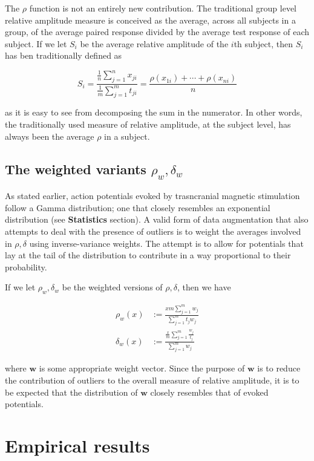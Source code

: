 \documentclass{article}
\begin{document}
\begin{multicols}{2}
The $\rho$ function is not an entirely new contribution. The
traditional group level relative amplitude measure is
conceived as the average, across all subjects in a group, of
the average paired response divided by the average test
response of each subject. If we let $S_i$ be the average
relative amplitude of the $i$th subject, then $S_i$ has ben
traditionally defined as

\begin{equation} S_i=\frac{\frac{1}{n}\sum_{j=1}^n
x_{ji}}{\frac{1}{m}\sum_{j=1}^m t_{ji}} =
\frac{\rho(x_{1i})+\cdots + \rho(x_{ni})}{n} \end{equation}

as it is easy to see from decomposing the sum in the
numerator. In other words, the traditionally used measure of
relative amplitude, at the subject level, has always been
the average $\rho$ in a subject. 

\subsection{The weighted variants $\rho_w, \delta_w$}

As stated earlier, action potentials evoked by trasncranial
magnetic stimulation follow a Gamma distribution; one that
closely resembles an exponential distribution (see
\textbf{Statistics} section). A valid form of data
augmentation that also attempts to deal with the presence of
outliers is to weight the averages involved in $\rho,
\delta$ using inverse-variance weights. The attempt is to
allow for potentials that lay at the tail of the
distribution to contribute in a way proportional to their
probability. 

If we let $\rho_w, \delta_w$ be the weighted versions of
$\rho, \delta$, then we have 

        \begin{align} \rho_w(x) &:= \frac{xm\sum_{j=1}^m
        w_j}{\sum_{j=1}^m t_j w_j} \\ \delta_w(x) &:=
    \frac{\frac{x}{m}\sum_{j=1}^m\frac{w_j}{t_j}}{\sum_{j=1}^m
w_j} \end{align}

where $\textbf{w}$ is some appropriate weight vector. Since
the purpose of $\textbf{w}$ is to reduce the contribution of
outliers to the overall measure of relative amplitude, it is
to be expected that the distribution of $\textbf{w}$ closely
resembles that of evoked potentials.

\section{Empirical results}


\end{multicols}
\end{document}
